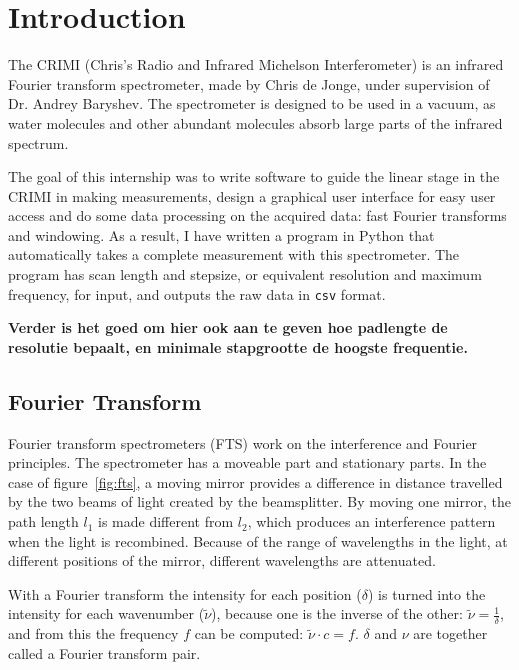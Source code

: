 
\section{Introduction}
The CRIMI (Chris's Radio and Infrared Michelson Interferometer) is an infrared Fourier transform spectrometer, made by Chris de Jonge, under supervision of Dr. Andrey Baryshev. The spectrometer is designed to be used in a vacuum, as water molecules and other abundant molecules absorb large parts of the infrared spectrum.

The goal of this internship was to write software to guide the linear stage in the CRIMI in making measurements, design a graphical user interface for easy user access and do some data processing on the acquired data: fast Fourier transforms and windowing. As a result, I have written a program in Python that automatically takes a complete measurement with this spectrometer. The program has scan length and stepsize, or equivalent resolution and maximum frequency, for input, and outputs the raw data in \verb!csv! format.

\textbf{Verder is het goed om hier ook aan te geven hoe padlengte de resolutie bepaalt, en minimale stapgrootte de hoogste frequentie.}

\subsection{Fourier Transform}

Fourier transform spectrometers (FTS) work on the interference and Fourier principles. The spectrometer has a moveable part and stationary parts. In the case of figure~\ref{fig:fts}, a moving mirror provides a difference in distance travelled by the two beams of light created by the beamsplitter. By moving one mirror, the path length $l_1$ is made different from $l_2$, which produces an interference pattern when the light is recombined. Because of the range of wavelengths in the light, at different positions of the mirror, different wavelengths are attenuated.

With a Fourier transform the intensity for each position ($\delta$) is turned into the intensity for each wavenumber ($\tilde{\nu}$), because one is the inverse of the other: $\tilde{\nu} = \frac{1}{\delta}$, and from this the frequency $f$ can be computed: $\tilde{\nu}\cdot c=f$. $\delta$ and $\nu$ are together called a Fourier transform pair.

